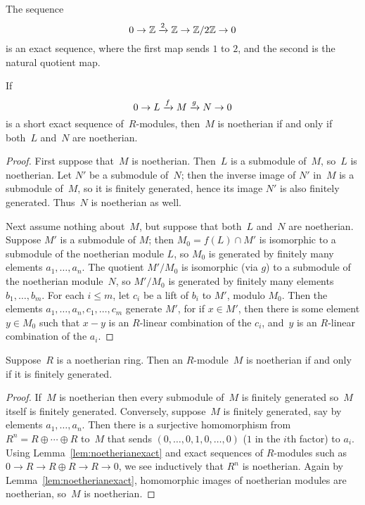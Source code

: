 \begin{example}
	The sequence
	$$
		0 \to \mathbb{Z} \xrightarrow{2} \mathbb{Z}\rightarrow \mathbb{Z}/2\mathbb{Z} \to 0
	$$
	is an exact sequence, where the first map sends $1$ to $2$,
	and the second is the natural quotient map.
\end{example}


\begin{lemma}\label{lem:noetherianexact}
	If
	$$
		0 \to L \xrightarrow{f} M \xrightarrow{g} N \to 0
	$$
	is a short exact sequence of~$R$-modules, then~$M$ is noetherian
	if and only if both~$L$ and~$N$ are noetherian.
\end{lemma}
\begin{proof}
	First suppose that~$M$ is noetherian.  Then~$L$ is a submodule
	of~$M$, so~$L$ is noetherian.  Let $N'$ be a submodule of~$N$;
	then the inverse image of $N'$ in~$M$ is a submodule of~$M$,
	so it is finitely generated, hence its image $N'$ is also finitely
	generated.  Thus~$N$ is noetherian as well.

	Next assume nothing about~$M$, but suppose that both~$L$ and~$N$ are
	noetherian.  Suppose $M'$ is a submodule of $M$; then $M_0=f(L)\cap M'$
	is isomorphic to a submodule of the noetherian module $L$, so $M_0$ is
	generated by finitely many elements $a_1,\ldots, a_n$.  The quotient
	$M'/M_0$ is isomorphic (via $g$) to a submodule of the noetherian
	module~$N$, so $M'/M_0$ is generated by finitely many elements
	$b_1,\ldots, b_m$. For each $i\leq m$, let $c_i$ be a lift of $b_i$ to
	$M'$, modulo $M_0$.  Then the elements $a_1,\ldots, a_n, c_1,\ldots,c_m$ 
	generate $M'$, for if $x\in M'$, then there is some element
	$y\in M_0$ such that $x-y$ is an $R$-linear combination of the $c_i$,
	and~$y$ is an $R$-linear combination of the $a_i$.
\end{proof}


\begin{proposition}
	\label{prop:noethfg}
	Suppose~$R$ is a noetherian ring.  Then an $R$-module~$M$ is
	noetherian if and only if it is finitely generated.
\end{proposition}
\begin{proof}
	If~$M$ is noetherian then every submodule of~$M$ is finitely generated
	so~$M$ itself is finitely generated.  Conversely, suppose~$M$ is
	finitely generated, say by elements $a_1,\ldots, a_n$.  Then there is a
	surjective homomorphism from $R^n=R\oplus \cdots \oplus R$ to~$M$ that
	sends $(0,\ldots,0,1,0,\ldots,0)$ ($1$ in the $i$th factor) to $a_i$.
	Using Lemma~\ref{lem:noetherianexact} and exact sequences of
	$R$-modules such as $0\to R\to R\oplus R\to R\to 0$, we see
	inductively that $R^n$ is noetherian.  Again by
	Lemma~\ref{lem:noetherianexact}, homomorphic images of noetherian
	modules are noetherian, so~$M$ is noetherian.
\end{proof}

